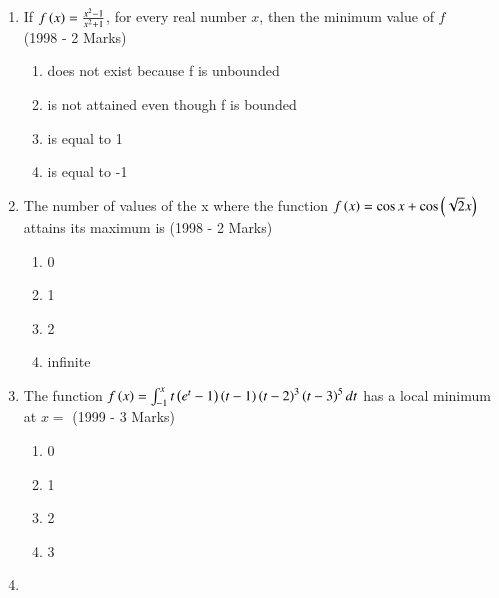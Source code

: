 \documentclass[journal]{IEEEtran}
\begin{document}
    \begin{enumerate}
    \item{
            If $f\left(x\right) =  \frac{x^2-1}{x^2+1}$, for every real number $x$, then the minimum value of $f$  \\ \text{  }\hfill
                {(1998 - 2 Marks)}
            \begin{enumerate}
                \item does not exist because f is unbounded
                \item is not attained even though f is bounded
                \item is equal to 1
                \item is equal to -1
            \end{enumerate} 
            }
    \item{
            The number of values of the x where the function $f\left(x\right)=\cos x + \cos\left(\sqrt{2}x\right)$ attains its maximum is  \hfill
                {(1998 - 2 Marks)}
            \begin{multicols}{2}
                \begin{enumerate}
                    \item 0
                    \item 1
                    \item 2
                    \item infinite
                \end{enumerate}
            \end{multicols}
        }
    \item{
     
            The function $f\left(x\right)= \int_{-1}^x t\left(e^t-1\right)\left(t-1\right)\left(t-2\right)^3\left(t-3\right)^5dt$ has a local minimum at $x=$  \hfill
                {(1999 - 3 Marks)}
            \begin{multicols}{2}
                \begin{enumerate}
                    \item 0 
                    \item 1
                    \item 2
                    \item 3
                \end{enumerate}
            \end{multicols}
        
        }
    \item{
        
}
\end{enumerate}
\end{document}
